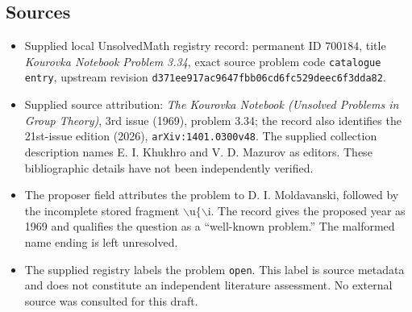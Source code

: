 \documentclass[11pt]{article}
\begin{document}
\subsection{Sources}
\begin{itemize}
\item Supplied local UnsolvedMath registry record: permanent ID \(700184\), title \emph{Kourovka Notebook Problem 3.34}, exact source problem code \texttt{catalogue entry}, upstream revision \texttt{d371ee917ac9647fbb06cd6fc529deec6f3dda82}.
\item Supplied source attribution: \emph{The Kourovka Notebook (Unsolved Problems in Group Theory)}, 3rd issue (1969), problem 3.34; the record also identifies the 21st-issue edition (2026), \texttt{arXiv:1401.0300v48}. The supplied collection description names E. I. Khukhro and V. D. Mazurov as editors. These bibliographic details have not been independently verified.
\item The proposer field attributes the problem to D. I. Moldavanski, followed by the incomplete stored fragment \(\backslash\mathrm{u}\{\backslash\mathrm{i}\). The record gives the proposed year as 1969 and qualifies the question as a ``well-known problem.'' The malformed name ending is left unresolved.
\item The supplied registry labels the problem \texttt{open}. This label is source metadata and does not constitute an independent literature assessment. No external source was consulted for this draft.
\end{itemize}
\end{document}
